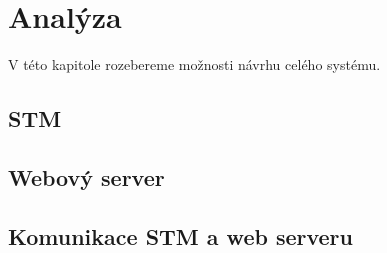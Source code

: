 \chapter{Analýza}

V této kapitole rozebereme možnosti návrhu celého systému.

\section{STM}




\section{Webový server}


\section{Komunikace STM a web serveru} \label{analyza-komunikace}

